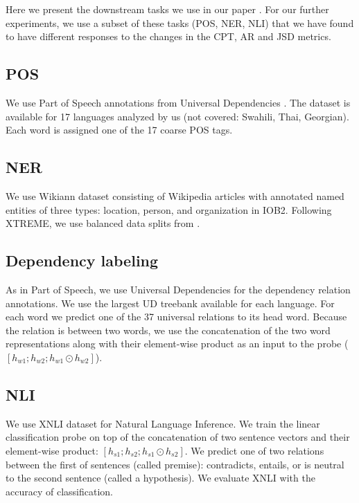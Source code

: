 Here we present the downstream tasks we use in our paper \cite{limisiewicz_tokenization_2023}. For our further experiments, we use a subset of these tasks (POS, NER, NLI) that we have found to have different responses to the changes in the CPT, AR and JSD metrics.

\subsection{POS}

We use Part of Speech annotations from Universal Dependencies \cite{nivre_universal_2020}. The dataset is available for 17 languages analyzed by us (not covered: Swahili, Thai, Georgian). Each word is assigned one of the 17 coarse POS tags.

\subsection{NER}

We use Wikiann dataset \cite{pan_cross-lingual_2017} consisting of Wikipedia articles with annotated named entities of three types: location, person, and organization in IOB2. Following XTREME, we use balanced data splits from \cite{rahimi_massively_2019}.

\subsection{Dependency labeling}

As in Part of Speech, we use Universal Dependencies \cite{nivre_universal_2020} for the dependency relation annotations. We use the largest UD treebank available for each language.
For each word we predict one of the 37 universal relations to its head word. Because the relation is between two words, we use the concatenation of the two word representations along with their element-wise product as an input to the probe ($[h_{w1}; h_{w2}; h_{w1} \odot h_{w2}]$).

\subsection{NLI}

We use XNLI dataset \cite{conneau_xnli_2018} for Natural Language Inference. We train the linear classification probe on top of the concatenation of two sentence vectors and their element-wise product: $[h_{s1}; h_{s2}; h_{s1} \odot h_{s2}]$. We predict one of two relations between the first of sentences (called premise): contradicts, entails, or is neutral to the second sentence (called a hypothesis). We evaluate XNLI with the accuracy of classification.

